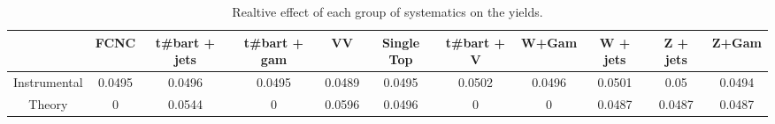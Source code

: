 \begin{table}[htbp]
\begin{center}
\begin{tabular}{|c|c|c|c|c|c|c|c|c|c|c|}
\hline 
      & FCNC      & t#bar{t} + jets      & t#bar{t} +  gam      & VV      & Single Top      & t#bar{t} + V      & W+Gam      & W + jets      & Z + jets      & Z+Gam \\ 
\hline 
 Instrumental & 0.0495 & 0.0496 & 0.0495 & 0.0489 & 0.0495 & 0.0502 & 0.0496 & 0.0501 & 0.05 & 0.0494 \\ 
 Theory & 0 & 0.0544 & 0 & 0.0596 & 0.0496 & 0 & 0 & 0.0487 & 0.0487 & 0.0487 \\ 
\hline 
\end{tabular} 
\caption{Realtive effect of each group of systematics on the yields.} 
\end{center} 
\end{table} 
